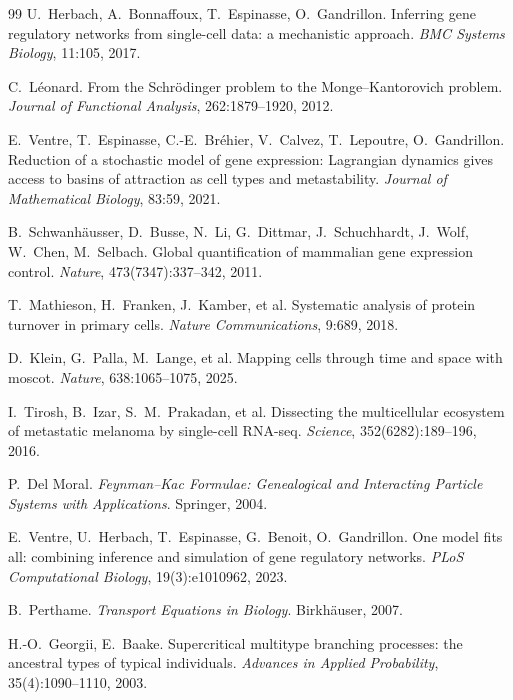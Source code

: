 \documentclass[a4paper, 11pt]{article}
\theoremstyle{plain}
\theoremstyle{remark}
\begin{document}
\begin{thebibliography}{99}
U.~Herbach, A.~Bonnaffoux, T.~Espinasse, O.~Gandrillon.
\newblock Inferring gene regulatory networks from single-cell data: a mechanistic approach.
\newblock \emph{BMC Systems Biology}, 11:105, 2017.

C.~Léonard.
\newblock From the Schrödinger problem to the Monge--Kantorovich problem.
\newblock \emph{Journal of Functional Analysis}, 262:1879--1920, 2012.

E.~Ventre, T.~Espinasse, C.-E.~Bréhier, V.~Calvez, T.~Lepoutre, O.~Gandrillon.
\newblock Reduction of a stochastic model of gene expression: Lagrangian dynamics gives access to basins of attraction as cell types and metastability.
\newblock \emph{Journal of Mathematical Biology}, 83:59, 2021.

B.~Schwanh{\"a}usser, D.~Busse, N.~Li, G.~Dittmar, J.~Schuchhardt, J.~Wolf, W.~Chen, M.~Selbach.
\newblock Global quantification of mammalian gene expression control.
\newblock \emph{Nature}, 473(7347):337--342, 2011.

T.~Mathieson, H.~Franken, J.~Kamber, et al.
\newblock Systematic analysis of protein turnover in primary cells.
\newblock \emph{Nature Communications}, 9:689, 2018.

D.~Klein, G.~Palla, M.~Lange, et al.
\newblock Mapping cells through time and space with moscot.
\newblock \emph{Nature}, 638:1065--1075, 2025.

I.~Tirosh, B.~Izar, S.~M.~Prakadan, et al.
\newblock Dissecting the multicellular ecosystem of metastatic melanoma by single-cell RNA-seq.
\newblock \emph{Science}, 352(6282):189--196, 2016.

P.~Del Moral.
\newblock \emph{Feynman--Kac Formulae: Genealogical and Interacting Particle Systems with Applications}.
\newblock Springer, 2004.

E.~Ventre, U.~Herbach, T.~Espinasse, G.~Benoit, O.~Gandrillon.
\newblock One model fits all: combining inference and simulation of gene regulatory networks.
\newblock \emph{PLoS Computational Biology}, 19(3):e1010962, 2023.

B.~Perthame.
\newblock \emph{Transport Equations in Biology}.
\newblock Birkhäuser, 2007.

H.-O.~Georgii, E.~Baake.
\newblock Supercritical multitype branching processes: the ancestral types of typical individuals.
\newblock \emph{Advances in Applied Probability}, 35(4):1090--1110, 2003.


\end{thebibliography}
\end{document}
